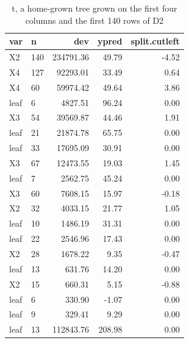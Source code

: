\documentclass[12pt,twoside]{reedthesis}
\begin{document}
  \begin{table}
  
  \caption{\label{tab:unnamed-chunk-22}\label{tab:tabhomegrowntree}t, a home-grown tree grown on the first four columns and the first 140 rows of D2}
  \centering
  \begin{tabular}[t]{l|l|r|r|r}
  \hline
  var & n & dev & ypred & split.cutleft\\
  \hline
  X2 & 140 & 234791.36 & 49.79 & -4.52\\
  \hline
  X4 & 127 & 92293.01 & 33.49 & 0.64\\
  \hline
  X4 & 60 & 59974.42 & 49.64 & 3.86\\
  \hline
  leaf & 6 & 4827.51 & 96.24 & 0.00\\
  \hline
  X3 & 54 & 39569.87 & 44.46 & 1.91\\
  \hline
  leaf & 21 & 21874.78 & 65.75 & 0.00\\
  \hline
  leaf & 33 & 17695.09 & 30.91 & 0.00\\
  \hline
  X3 & 67 & 12473.55 & 19.03 & 1.45\\
  \hline
  leaf & 7 & 2562.75 & 45.24 & 0.00\\
  \hline
  X3 & 60 & 7608.15 & 15.97 & -0.18\\
  \hline
  X2 & 32 & 4033.15 & 21.77 & 1.05\\
  \hline
  leaf & 10 & 1486.19 & 31.31 & 0.00\\
  \hline
  leaf & 22 & 2546.96 & 17.43 & 0.00\\
  \hline
  X2 & 28 & 1678.22 & 9.35 & -0.47\\
  \hline
  leaf & 13 & 631.76 & 14.20 & 0.00\\
  \hline
  X2 & 15 & 660.31 & 5.15 & -0.88\\
  \hline
  leaf & 6 & 330.90 & -1.07 & 0.00\\
  \hline
  leaf & 9 & 329.41 & 9.29 & 0.00\\
  \hline
  leaf & 13 & 112843.76 & 208.98 & 0.00\\
  \hline
  \end{tabular}
  \end{table}
  
\end{document}
